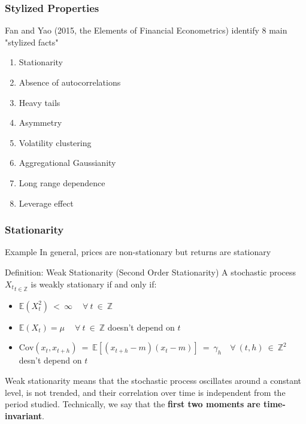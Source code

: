 \documentclass{beamer}
\begin{document}
\begin{frame}
  \frametitle{Stylized Properties}

  Fan and Yao (2015, the Elements of Financial Econometrics) identify 8 main "stylized facts"
  
  \begin{enumerate}
  \item Stationarity
  \item Absence of autocorrelations
  \item Heavy tails
  \item Asymmetry
  \item Volatility clustering
  \item Aggregational Gaussianity
  \item Long range dependence
  \item Leverage effect
  \end{enumerate}
  
\end{frame}



\begin{frame}
  \frametitle{Stationarity}
  \begin{exampleblock}{Example}
   In general, prices are non-stationary but returns are stationary 
 \end{exampleblock}

 \begin{block}{Definition: Weak Stationarity (Second Order Stationarity)}
   A stochastic process ${X_t}_{t \in \mathbb{Z}}$ is weakly stationary if and only if:

   \begin{itemize}
   \item $\mathbb{E}(X^2_t) \ < \ \infty \ \quad \forall \ t \ \in \ \mathbb{Z}$
   \item $\mathbb{E}(X_t) = \mu \ \quad \forall \ t \ \in \ \mathbb{Z}$ doesn't depend on $t$
   \item $\text{Cov}(x_t, x_{t+h}) \ = \ \mathbb{E}[(x_{t+h} - m)(x_t - m)] \ = \ \gamma_h \quad \forall \ (t, h) \ \in \ \mathbb{Z}^2$ desn't depend on $t$
   \end{itemize}

   Weak stationarity means that the stochastic process oscillates around a constant level, is not trended, and their correlation over time is independent from the period studied. Technically, we say that the \textbf{first two moments are time-invariant}.\\
   
 \end{block}
 
\end{frame}
\end{document}
